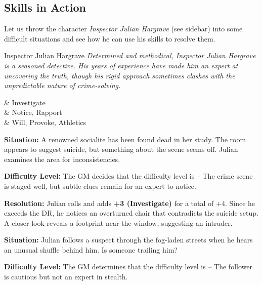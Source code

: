 	\begin{multicols}{2}
	\subsection{Skills in Action}

	Let us throw the character \emph{Inspector Julian Hargrave} (see sidebar) into some difficult situations and see how he can use his skills to resolve them.

	\begin{NPC}{Inspector Julian Hargrave}
		\emph{Determined and methodical, Inspector Julian Hargrave is a seasoned detective. His years of experience have made him an expert at uncovering the truth, though his rigid approach sometimes clashes with the unpredictable nature of crime-solving.}

		\vspace{0.5\baselineskip}
		\begin{SkillsBox}
			\Expert & Investigate \\
			\Skilled & Notice, Rapport \\
			\Novice & Will, Provoke, Athletics \\
		\end{SkillsBox}
	\end{NPC}

	\begin{Example}
		\textbf{Situation:} A renowned socialite has been found dead in her study. The room appears to suggest suicide, but something about the scene seems off. Julian examines the area for inconsistencies.

		\noindent
		\textbf{Difficulty Level:} The GM decides that the difficulty level is \Formidable – The crime scene is staged well, but subtle clues remain for an expert to notice.

		\raggedright\noindent
		\textbf{Resolution:} Julian rolls  and adds \textbf{+3 (Investigate)} for a total of +4. Since he exceeds the DR, he notices an overturned chair that contradicts the suicide setup. A closer look reveals a footprint near the window, suggesting an intruder.
	\end{Example}


	\begin{Example}
		\textbf{Situation:} Julian follows a suspect through the fog-laden streets when he hears an unusual shuffle behind him. Is someone trailing him?

		\noindent\textbf{Difficulty Level:} The GM determines that the difficulty level is \Difficult – The follower is cautious but not an expert in stealth.


\end{Example}
\end{multicols}
